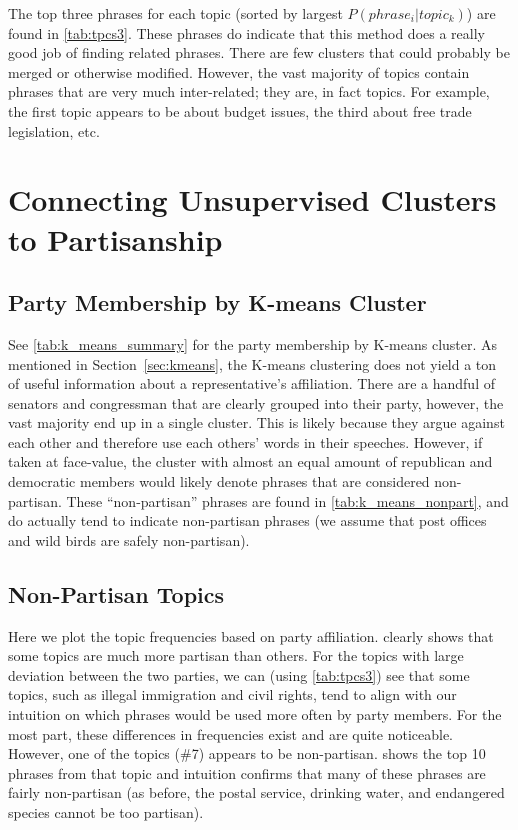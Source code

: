 \documentclass[11pt, fleqn]{article}
\begin{document}
The top three phrases for each topic (sorted by largest $P(phrase_i|topic_k)$) are found in \vref{tab:tpcs3}.  These phrases do indicate that this method does a really good job of finding related phrases.  There are few clusters that could probably be merged or otherwise modified.  However, the vast majority of topics contain phrases that are very much inter-related; they are, in fact topics.  For example, the first topic appears to be about budget issues, the third about free trade legislation, etc.



\section{Connecting Unsupervised Clusters to Partisanship}
\subsection{Party Membership by K-means Cluster}
See \vref{tab:k_means_summary} for the party membership by K-means cluster.  As mentioned in Section~\cref{sec:kmeans}, the K-means clustering does not yield a ton of useful information about a representative's affiliation.  There are a handful of senators and congressman that are clearly grouped into their party, however, the vast majority end up in a single cluster.  This is likely because they argue against each other and therefore use each others' words in their speeches.  However, if taken at face-value, the cluster with almost an equal amount of republican and democratic members would likely denote phrases that are considered non-partisan.  These ``non-partisan'' phrases are found in \vref{tab:k_means_nonpart}, and do actually tend to indicate non-partisan phrases (we assume that post offices and wild birds are safely non-partisan).




\subsection{Non-Partisan Topics}

Here we plot the topic frequencies based on party affiliation.   clearly shows that some topics are much more partisan than others.  For the topics with large deviation between the two parties, we can (using \vref{tab:tpcs3}) see that some topics, such as illegal immigration and civil rights, tend to align with our intuition on which phrases would be used more often by party members.  For the most part, these differences in frequencies exist and are quite noticeable.  However, one of the topics (\#7) appears to be non-partisan.   shows the top 10 phrases from that topic and intuition confirms that many of these phrases are fairly non-partisan (as before, the postal service, drinking water, and endangered species cannot be too partisan).
\end{document}
